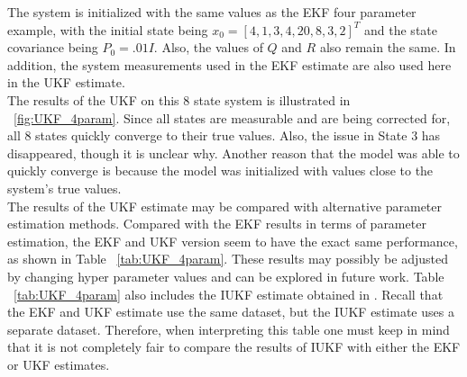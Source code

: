 \noindent The system is initialized with the same values as the EKF four parameter example, with the initial state being $x_0 = [4, 1, 3, 4, 20, 8, 3, 2]^T$ and the state covariance being $P_0 = .01I$. Also, the values of $Q$ and $R$ also remain the same. In addition, the system measurements used in the EKF estimate are also used here in the UKF estimate.  \\

\noindent The results of the UKF on this 8 state system is illustrated in ~\ref{fig:UKF_4param}. Since all states are measurable and are being corrected for, all 8 states quickly converge to their true values. Also, the issue in State 3 has disappeared, though it is unclear why. Another reason that the model was able to quickly converge is because the model was initialized with values close to the system's true values. \\

\noindent The results of the UKF estimate may be compared with alternative parameter estimation methods. Compared with the EKF results in terms of parameter estimation, the EKF and UKF version seem to have the exact same performance, as shown in Table ~\ref{tab:UKF_4param}. These results may possibly be adjusted by changing hyper parameter values and can be explored in future work. Table ~\ref{tab:UKF_4param} also includes the IUKF estimate obtained in \cite{article5}. Recall that the EKF and UKF estimate use the same dataset, but the IUKF estimate uses a separate dataset. Therefore, when interpreting this table one must keep in mind that it is not completely fair to compare the results of IUKF with either the EKF or UKF estimates.



\newpage

